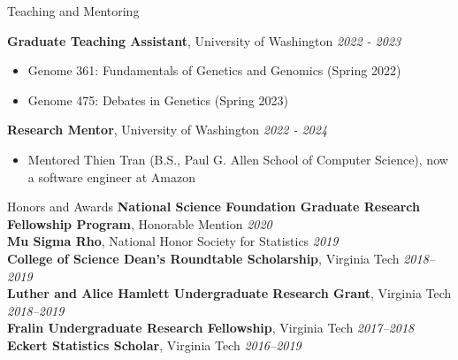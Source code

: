 \documentclass{resume} %
\begin{document}

\begin{rSection}{Teaching and Mentoring}

{\bf Graduate Teaching Assistant}, University of Washington \hfill {\em 2022 - 2023}
\begin{itemize}
    \item Genome 361: Fundamentals of Genetics and Genomics (Spring 2022)
    \item Genome 475: Debates in Genetics (Spring 2023)
\end{itemize}

{\bf Research Mentor}, University of Washington \hfill {\em 2022 - 2024}
\begin{itemize}
    \item Mentored Thien Tran (B.S., Paul G. Allen School of Computer Science), now a software engineer at Amazon
\end{itemize}

\end{rSection}


\begin{rSection}{Honors and Awards}
{\bf National Science Foundation Graduate Research Fellowship Program}, Honorable Mention \hfill {\em 2020} \\
{\bf Mu Sigma Rho}, National Honor Society for Statistics \hfill {\em 2019} \\
{\bf College of Science Dean's Roundtable Scholarship}, Virginia Tech \hfill {\em 2018--2019} \\
{\bf Luther and Alice Hamlett Undergraduate Research Grant}, Virginia Tech \hfill {\em 2018--2019} \\
{\bf Fralin Undergraduate Research Fellowship}, Virginia Tech \hfill {\em 2017--2018} \\
{\bf Eckert Statistics Scholar}, Virginia Tech \hfill {\em 2016--2019}
\end{rSection}




\end{document}
